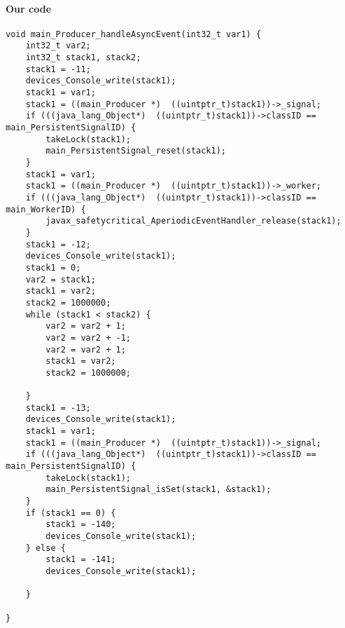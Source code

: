 \begin{landscape}
\begin{multicols}{2}
\paragraph{Our code}\hfill
\begin{lstlisting}[firstnumber=1525]
void main_Producer_handleAsyncEvent(int32_t var1) {
	int32_t var2;
	int32_t stack1, stack2;
	stack1 = -11;
	devices_Console_write(stack1);
	stack1 = var1;
	stack1 = ((main_Producer *)  ((uintptr_t)stack1))->_signal;
	if (((java_lang_Object*)  ((uintptr_t)stack1))->classID == main_PersistentSignalID) {
		takeLock(stack1);
		main_PersistentSignal_reset(stack1);
	}
	stack1 = var1;
	stack1 = ((main_Producer *)  ((uintptr_t)stack1))->_worker;
	if (((java_lang_Object*)  ((uintptr_t)stack1))->classID == main_WorkerID) {
		javax_safetycritical_AperiodicEventHandler_release(stack1);
	}
	stack1 = -12;
	devices_Console_write(stack1);
	stack1 = 0;
	var2 = stack1;
	stack1 = var2;
	stack2 = 1000000;
	while (stack1 < stack2) {
		var2 = var2 + 1;
		var2 = var2 + -1;
		var2 = var2 + 1;
		stack1 = var2;
		stack2 = 1000000;

	}
	stack1 = -13;
	devices_Console_write(stack1);
	stack1 = var1;
	stack1 = ((main_Producer *)  ((uintptr_t)stack1))->_signal;
	if (((java_lang_Object*)  ((uintptr_t)stack1))->classID == main_PersistentSignalID) {
		takeLock(stack1);
		main_PersistentSignal_isSet(stack1, &stack1);
	}
	if (stack1 == 0) {
		stack1 = -140;
		devices_Console_write(stack1);
	} else {
		stack1 = -141;
		devices_Console_write(stack1);

	}

}
\end{lstlisting}


\end{multicols}
\end{landscape}

